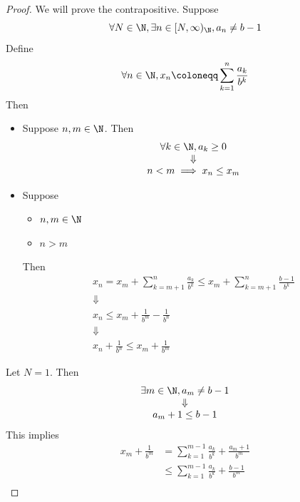 \begin{proof}
  We will prove the contrapositive. Suppose
  \[
    \forall N \in \N, \exists n \in [N, \infty)_{\N}, a_{n} \neq b - 1
  \]
  Define
  \[
    \forall n \in \N, x_{n} \coloneqq \sum_{k = 1}^{n} \frac{a_{k}}{b^{k}}
  \]
  Then
  \begin{itemize}
    \item Suppose $n, m \in \N$. Then
          \[
            \begin{array}{c}
              \forall k \in \N, a_{k} \geq 0 \\
              \Downarrow                     \\
              n < m \implies x_{n} \leq x_{m}
            \end{array}
          \]
    \item Suppose
          \begin{itemize}
            \item $n, m \in \N$
            \item $n > m$
          \end{itemize}
          Then
          \[
            \begin{array}{c}
              x_{n} = x_{m} + \sum_{k = m + 1}^{n} \frac{a_{k}}{b^{k}}
              \leq x_{m} + \sum_{k = m + 1}^{n} \frac{b - 1}{b^{k}} \\
              \Downarrow                                            \\
              x_{n} \leq x_{m} + \frac{1}{b^{m}} - \frac{1}{b^{n}}  \\
              \Downarrow                                            \\
              x_{n} + \frac{1}{b^{n}} \leq x_{m} + \frac{1}{b^{m}}
            \end{array}
          \]
  \end{itemize}
  Let $N = 1$. Then
  \[
    \begin{array}{c}
      \exists m \in \N, a_{m} \neq b - 1 \\
      \Downarrow                         \\
      a_{m} + 1 \leq b - 1
    \end{array}
  \]
  This implies
  \begin{align*}
    x_{m} + \frac{1}{b^{m}} & = \sum_{k = 1}^{m - 1} \frac{a_{k}}{b^{k}} + \frac{a_{m} + 1}{b^{m}} \\
                            & \leq \sum_{k = 1}^{m - 1} \frac{a_{k}}{b^{k}} + \frac{b - 1}{b^{m}}  \\

\end{align*}
\end{proof}

